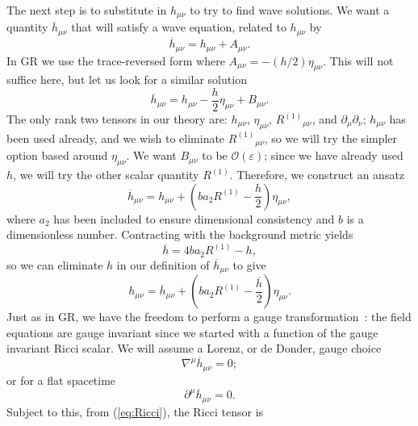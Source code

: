\documentclass[aps,prd,amsfonts,amssymb,amsmath,nofootinbib,reprint,showpacs]{revtex4-1}
\newcommand{\eqnref}[1]{(\ref{eq:#1})}
\newcommand{\order}[1]{\ensuremath{\mathcal{O}({#1})}}
\begin{document}
The next step is to substitute in $h_{\mu\nu}$ to try to find wave solutions. We want a quantity $\overline{h}_{\mu\nu}$ that will satisfy a wave equation, related to $h_{\mu\nu}$ by
\begin{equation}
\overline{h}_{\mu\nu} = h_{\mu\nu} + A_{\mu\nu}.
\end{equation}
In GR we use the trace-reversed form where $A_{\mu\nu} = -(h/2)\eta_{\mu\nu}$. This will not suffice here, but let us look for a similar solution
\begin{equation}
\overline{h}_{\mu\nu} = h_{\mu\nu} - \frac{h}{2}\eta_{\mu\nu} + B_{\mu\nu}.
\end{equation}
The only rank two tensors in our theory are: $h_{\mu\nu}$, $\eta_{\mu\nu}$, ${R^{(1)}}_{\mu\nu}$, and $\partial_\mu\partial_\nu$; $h_{\mu\nu}$ has been used already, and we wish to eliminate ${R^{(1)}}_{\mu\nu}$, so we will try the simpler option based around $\eta_{\mu\nu}$. We want $B_{\mu\nu}$ to be $\order{\varepsilon}$; since we have already used $h$, we will try the other scalar quantity $R^{(1)}$. Therefore, we construct an ansatz
\begin{equation}
\overline{h}_{\mu\nu} = h_{\mu\nu} + \left(b a_2 R^{(1)} - \frac{h}{2}\right)\eta_{\mu\nu},
\label{eq:Ansatz}
\end{equation}
where $a_2$ has been included to ensure dimensional consistency and $b$ is a dimensionless number. Contracting with the background metric yields
\begin{equation}
\overline{h} = 4b a_2 R^{(1)} - h,
\label{eq:h_trace}
\end{equation}
so we can eliminate $h$ in our definition of $\overline{h}_{\mu\nu}$ to give
\begin{equation}
h_{\mu\nu} = \overline{h}_{\mu\nu} + \left(b a_2 R^{(1)} -\frac{\overline{h}}{2}\right)\eta_{\mu\nu}.
\end{equation}
Just as in GR, we have the freedom to perform a gauge transformation~\cite{Misner1973, Hobson2006}: the field equations are gauge invariant since we started with a function of the gauge invariant Ricci scalar. We will assume a Lorenz, or de Donder, gauge choice
\begin{equation}
\nabla^\mu \overline{h}_{\mu\nu} = 0;
\end{equation}
or for a flat spacetime
\begin{equation}
\partial^\mu \overline{h}_{\mu\nu} = 0.
\label{eq:Lorenz}
\end{equation}
Subject to this, from \eqnref{Ricci}, the Ricci tensor is
\end{document}
